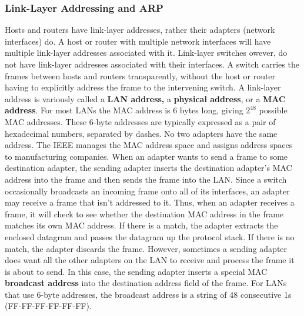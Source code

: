 \subsubsection{Link-Layer Addressing and ARP}
Hosts and routers have link-layer addresses, rather their adapters (network interfaces) do. A host or router with multiple network interfaces will have multiple link-layer addresses associated with it. Link-layer switches owever, do not have link-layer addresses associated with their interfaces. A switch carries the frames between hosts and routers transparently, without the host or router having to explicitly address the frame to the intervening switch. A link-layer address is variously called a \textbf{LAN address,} a \textbf{physical address}, or a \textbf{MAC address}. For most LANs the MAC address is 6 bytes long, giving $2^{48}$ possible MAC addresses. These 6-byte addresses are typically expressed as a pair of hexadecimal numbers, separated by dashes. No two adapters have the same address. The IEEE manages the MAC address space and assigns address spaces to manufacturing companies. When an adapter wants to send a frame to some destination adapter, the sending adapter inserts the destination adapter's MAC address into the frame and then sends the frame into the LAN. Since a switch occasionally broadcasts an incoming frame onto all of its interfaces, an adapter may receive a frame that isn't addressed to it. Thus, when an adapter receives a frame, it will check to see whether the destination MAC address in the frame matches its own MAC address. If there is a match, the adapter extracts the enclosed datagram and passes the datagram up the protocol stack. If there is no match, the adapter discards the frame. However, sometimes a sending adapter does want all the other adapters on the LAN to receive and process the frame it is about to send. In this case, the sending adapter inserts a special MAC \textbf{broadcast address} into the destination address field of the frame. For LANs that use 6-byte addresses, the broadcast address is a string of 48 consecutive 1s (FF-FF-FF-FF-FF-FF).\vspace{.3cm}\\

